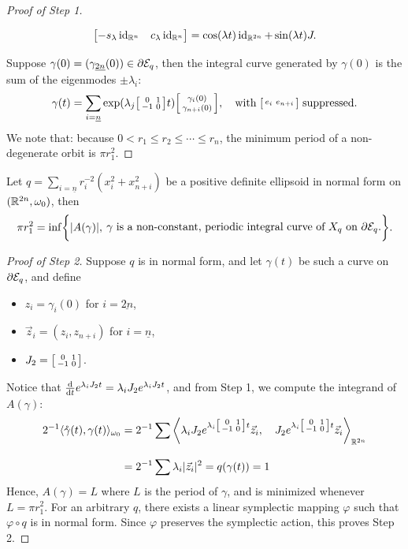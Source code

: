 \documentclass[../main-v2-manifolds.tex]{subfiles}
\begin{document}
\begin{proof}[Proof of Step 1]
\begin{note}
\begin{equation}
\begin{bmatrix}
            -s_\lambda \operatorname{id}_{{\mathbb{R}^n}} & c_{\lambda} \operatorname{id}_{{\mathbb{R}^n}}
        \end{bmatrix} = \cos(\lambda t)\operatorname{id}_{{\mathbb{R}^{2n}}} +\sin(\lambda t)J.
        \label{eq:matrix exponential j r2n lambda}
    \end{equation}
\end{note}
Suppose $\gamma(0) = (\gamma_{\underline{2n}}(0))\in\partial\mathcal{E}_q$, then the integral curve generated by $\gamma(0)$ is the sum of the eigenmodes $\pm\lambda_i$:
\[
    \gamma(t) = \sum_{i=\underline{n}}\operatorname{exp}(\lambda_j\begin{bsmallmatrix} 0 & 1 \\ -1 & 0 \end{bsmallmatrix} t)\begin{bsmallmatrix}
        \gamma_i(0) \\ \gamma_{n+i}(0)
    \end{bsmallmatrix},\quad\text{with }\begin{bsmallmatrix} e_i & e_{n+i} \end{bsmallmatrix} \text{ suppressed.}
\]
We note that: because $0<r_1\leq r_2\leq\cdots\leq r_n$, the minimum period of a non-degenerate orbit is $\pi r_1^2$. 
\end{proof}
\begin{step}
    Let $q = \sum_{i=\underline{n}} r_i^{-2}(x^2_i + x^2_{n+i})$ be a positive definite ellipsoid in normal form on $({\mathbb{R}^{2n}},\omega_0)$, then
    \[
        \pi r_1^2 = \inf\bigset{\abs{A(\gamma)},\: \parbox{25em}{$\gamma$ is a non-constant, periodic integral curve of $X_q$ on $\partial \Epsilon_q$.}}.
    \]
\end{step}
\begin{proof}[Proof of Step 2]
    Suppose $q$ is in normal form, and let $\gamma(t)$ be such a curve on $\partial \mathcal{E}_q$, and define 
    \begin{multicols}{3}
    \begin{itemize}
        \item $z_i = \gamma_i(0)$ for $i = \underline{2n}$,
        \item $\vec{z}_i = (z_i, z_{n+i})$ for $i = \underline{n}$,
        \item $J_2 = \begin{bsmallmatrix} 0 & 1 \\ -1 & 0 \end{bsmallmatrix}$.
    \end{itemize}    
    \end{multicols}
    Notice that $\dv{t}e^{\lambda_i J_2 t} = \lambda_i J_2e^{\lambda_i J_2 t}$, and from Step 1, we compute the integrand of $A(\gamma)$:
    \begin{align*}
        2^{-1}\langle \mathring{\gamma}(t),\gamma(t)\rangle_{\omega_0} &= 2^{-1}\sum \left\langle \lambda_i J_2 e^{\lambda_i \begin{bsmallmatrix} 0 & 1 \\ -1 & 0 \end{bsmallmatrix} t} \vec{z}_i,\quad J_2e^{\lambda_i \begin{bsmallmatrix} 0 & 1 \\ -1 & 0 \end{bsmallmatrix} t}\vec{z}_i\right\rangle_{{\mathbb{R}^{2n}}}\\[2ex]
        &= 2^{-1}\sum \lambda_i\vert {\vec{z}_i} \vert^2=q(\gamma(t))=1
    \end{align*}
    Hence, $A(\gamma) = L$ where $L$ is the period of $\gamma$, and is minimized whenever $L = \pi r_1^2$. For an arbitrary $q$, there exists a linear symplectic mapping $\varphi$ such that $\varphi\circ q$ is in normal form. Since $\varphi$ preserves the symplectic action, this proves Step 2.
\end{proof}
\end{document}
